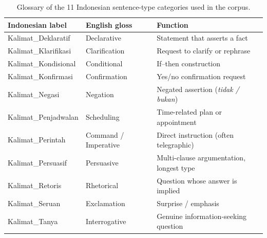 \begin{table}[!t]
  \centering
  \caption{Glossary of the 11 Indonesian sentence-type categories used in the corpus.}
  \label{tab:category_glossary}
  \small
  \begin{tabular}{lll}
  \toprule
  Indonesian label & English gloss & Function \\
  \midrule
  Kalimat\_Deklaratif  & Declarative          & Statement that asserts a fact \\
  Kalimat\_Klarifikasi & Clarification        & Request to clarify or rephrase \\
  Kalimat\_Kondisional & Conditional          & If--then construction \\
  Kalimat\_Konfirmasi  & Confirmation         & Yes/no confirmation request \\
  Kalimat\_Negasi      & Negation             & Negated assertion (\emph{tidak / bukan}) \\
  Kalimat\_Penjadwalan & Scheduling           & Time-related plan or appointment \\
  Kalimat\_Perintah    & Command / Imperative & Direct instruction (often telegraphic) \\
  Kalimat\_Persuasif   & Persuasive           & Multi-clause argumentation, longest type \\
  Kalimat\_Retoris     & Rhetorical           & Question whose answer is implied \\
  Kalimat\_Seruan      & Exclamation          & Surprise / emphasis \\
  Kalimat\_Tanya       & Interrogative        & Genuine information-seeking question \\
  \bottomrule
  \end{tabular}
\end{table}

